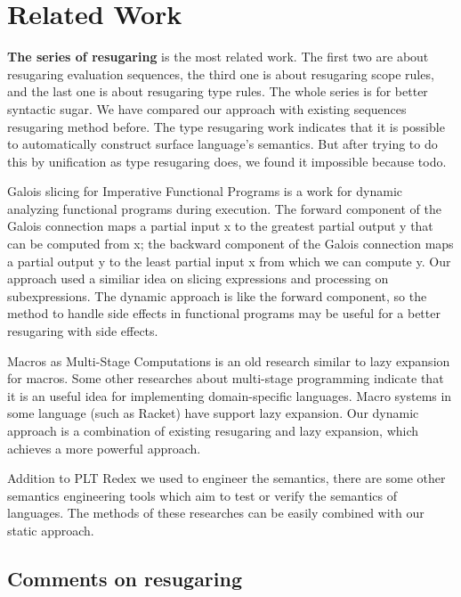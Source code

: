 \section{Related Work}
\label{sec5}

{\bfseries The series of resugaring\cite{resugaring,hygienic,resugaringtype,resugaringscope} }is the most related work. The first two are about resugaring evaluation sequences, the third one is about resugaring scope rules, and the last one is about resugaring type rules. The whole series is for better syntactic sugar. We have compared our approach with existing sequences resugaring method before. The type resugaring work indicates that it is possible to automatically construct surface language's semantics. But after trying to do this by unification as type resugaring does, we found it impossible because todo.


Galois slicing for Imperative Functional Programs\cite{slicing} is a work for dynamic analyzing functional programs during execution. The forward component of the Galois connection maps a partial input x to the greatest partial output y that can be computed from x; the backward component of the Galois connection maps a partial output y to the least partial input x from which we can compute y. Our approach used a similiar idea on slicing expressions and processing on subexpressions. The dynamic approach is like the forward component, so the method to handle side effects in functional programs may be useful for a better resugaring with side effects.

Macros as Multi-Stage Computations\cite{multistage} is an old research similar to lazy expansion for macros. Some other researches\cite{modularstaging} about multi-stage programming\cite{MSP} indicate that it is an useful idea for implementing domain-specific languages. Macro systems in some language (such as Racket\cite{racket}) have support lazy expansion. Our dynamic approach is a combination of existing resugaring and lazy expansion, which achieves a more powerful approach.

Addition to PLT Redex\cite{SEwPR} we used to engineer the semantics, there are some other semantics engineering tools\cite{dynsem,Ksemantic} which aim to test or verify the semantics of languages. The methods of these researches can be easily combined with our static approach.

\subsection{Comments on resugaring}

